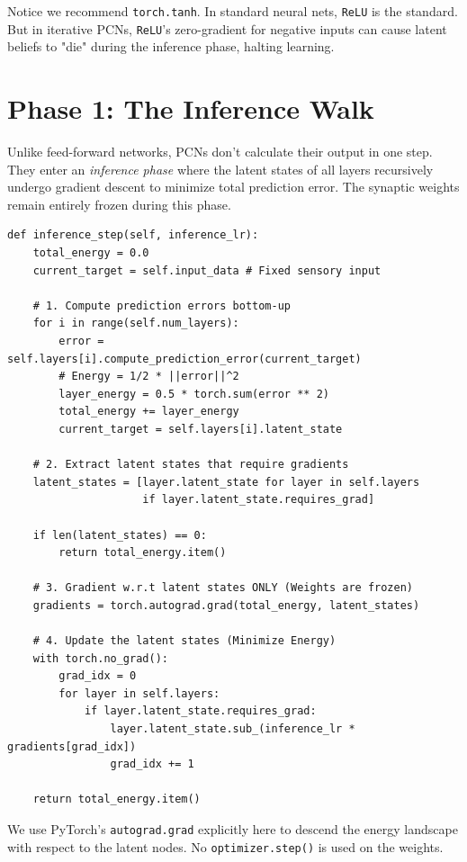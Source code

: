 \documentclass[12pt]{article}
\begin{document}
Notice we recommend \texttt{torch.tanh}. In standard neural nets, \texttt{ReLU} is the standard. But in iterative PCNs, \texttt{ReLU}'s zero-gradient for negative inputs can cause latent beliefs to "die" during the inference phase, halting learning.

\section*{Phase 1: The Inference Walk}

Unlike feed-forward networks, PCNs don't calculate their output in one step. They enter an \textit{inference phase} where the latent states of all layers recursively undergo gradient descent to minimize total prediction error. The synaptic weights remain entirely frozen during this phase.

\begin{verbatim}
def inference_step(self, inference_lr):
    total_energy = 0.0
    current_target = self.input_data # Fixed sensory input
    
    # 1. Compute prediction errors bottom-up
    for i in range(self.num_layers):
        error = self.layers[i].compute_prediction_error(current_target)
        # Energy = 1/2 * ||error||^2
        layer_energy = 0.5 * torch.sum(error ** 2)
        total_energy += layer_energy
        current_target = self.layers[i].latent_state
        
    # 2. Extract latent states that require gradients
    latent_states = [layer.latent_state for layer in self.layers 
                     if layer.latent_state.requires_grad]
                     
    if len(latent_states) == 0:
        return total_energy.item()

    # 3. Gradient w.r.t latent states ONLY (Weights are frozen)
    gradients = torch.autograd.grad(total_energy, latent_states)
    
    # 4. Update the latent states (Minimize Energy)
    with torch.no_grad():
        grad_idx = 0
        for layer in self.layers:
            if layer.latent_state.requires_grad:
                layer.latent_state.sub_(inference_lr * gradients[grad_idx])
                grad_idx += 1
                
    return total_energy.item()
\end{verbatim}

We use PyTorch's \texttt{autograd.grad} explicitly here to descend the energy landscape with respect to the latent nodes. No \texttt{optimizer.step()} is used on the weights.
\end{document}

